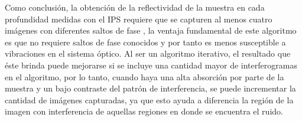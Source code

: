 %
%
%
%
%
%
%
Como conclusión, la obtención de la reflectividad de la muestra en cada profundidad medidas con el IPS requiere que se capturen al menos cuatro imágenes con diferentes saltos de fase \cite{Wang2004}, la ventaja fundamental de este algoritmo es que no requiere saltos de fase conocidos y por tanto es menos susceptible a vibraciones en el sistema óptico. Al ser un algoritmo iterativo, el resultado que éste brinda puede mejorarse si se incluye una cantidad mayor de interferogramas en el algoritmo, por lo tanto, cuando haya una alta absorción por parte de la muestra y un bajo contraste del patrón de interferencia, se puede incrementar la cantidad de imágenes capturadas, ya que esto ayuda a diferencia la región de la imagen con interferencia de aquellas regiones en donde se encuentra el ruido.

